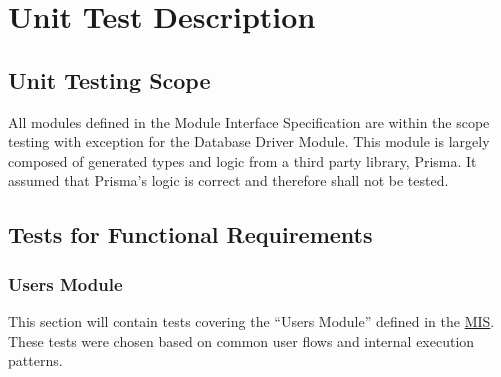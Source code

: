 \documentclass[12pt, titlepage]{article}
\begin{document}
\section{Unit Test Description} \label{Unit Test Description}

\subsection{Unit Testing Scope}


All modules defined in the Module Interface Specification are within the scope testing with
exception for the Database Driver Module. This module is largely composed of generated types and
logic from a third party library, Prisma. It assumed that Prisma's logic is correct and therefore
shall not be tested.

\subsection{Tests for Functional Requirements}


\subsubsection{Users Module}


This section will contain tests covering the ``Users Module'' defined in the
\href{https://github.com/arkinmodi/project-sayyara/blob/main/docs/Design/MIS/MIS.pdf}{MIS}. These
tests were chosen based on common user flows and internal execution patterns.
\end{document}
